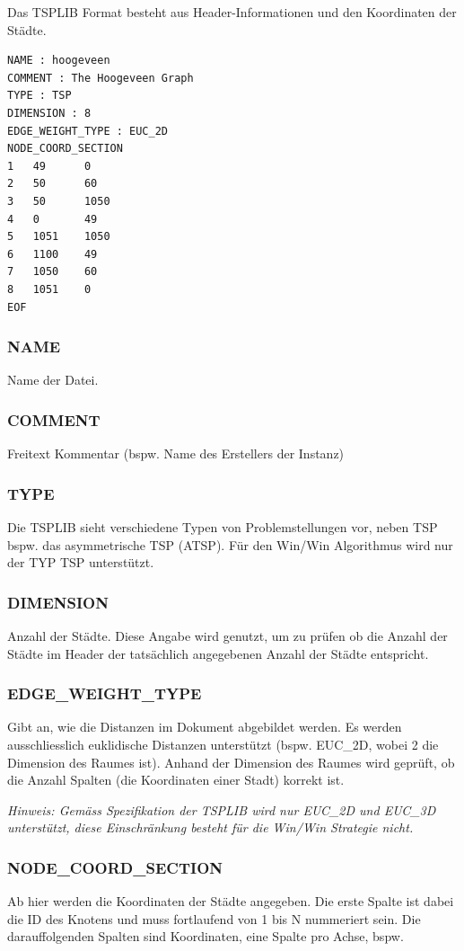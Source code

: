 \documentclass[11pt,a4paper]{article}
\begin{document}
Das TSPLIB Format besteht aus Header-Informationen und den Koordinaten der Städte.

\begin{verbatim}
NAME : hoogeveen 
COMMENT : The Hoogeveen Graph 
TYPE : TSP 
DIMENSION : 8 
EDGE_WEIGHT_TYPE : EUC_2D
NODE_COORD_SECTION
1   49      0   
2   50      60  
3   50      1050
4   0       49  
5   1051    1050
6   1100    49  
7   1050    60  
8   1051    0   
EOF
\end{verbatim}

\subsubsection{NAME}
Name der Datei.

\subsubsection{COMMENT}
Freitext Kommentar (bspw. Name des Erstellers der Instanz)

\subsubsection{TYPE}
Die TSPLIB sieht verschiedene Typen von Problemstellungen vor, neben TSP bspw. das asymmetrische TSP (ATSP). Für den Win/Win Algorithmus wird nur der TYP TSP unterstützt.

\subsubsection{DIMENSION}
Anzahl der Städte. Diese Angabe wird genutzt, um zu prüfen ob die Anzahl der Städte im Header der tatsächlich angegebenen Anzahl der Städte entspricht.

\subsubsection{EDGE\_WEIGHT\_TYPE}
Gibt an, wie die Distanzen im Dokument abgebildet werden. Es werden ausschliesslich euklidische Distanzen unterstützt (bspw. EUC\_2D, wobei 2 die Dimension des Raumes ist).
Anhand der Dimension des Raumes wird geprüft, ob die Anzahl Spalten (die Koordinaten einer Stadt) korrekt ist.

\emph{Hinweis: Gemäss Spezifikation der TSPLIB wird nur EUC\_2D und EUC\_3D unterstützt, diese Einschränkung besteht für die Win/Win Strategie nicht.}

\subsubsection{NODE\_COORD\_SECTION}
Ab hier werden die Koordinaten der Städte angegeben. Die erste Spalte ist dabei die ID des Knotens und muss fortlaufend von 1 bis N nummeriert sein. Die darauffolgenden Spalten sind Koordinaten, eine Spalte pro Achse, bspw.
\end{document}
